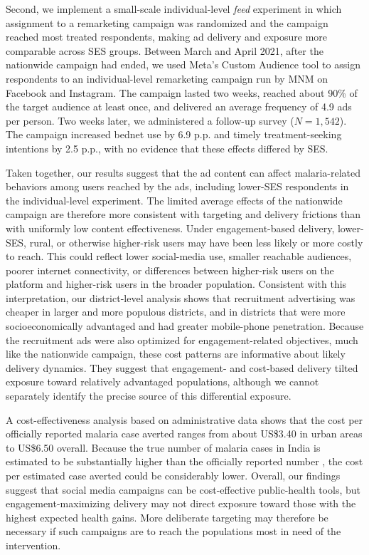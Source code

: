 Second, we implement a small-scale individual-level \textit{feed} experiment in which assignment to a remarketing campaign was randomized and the campaign reached most treated respondents, making ad delivery and exposure more comparable across SES groups. Between March and April 2021, after the nationwide campaign had ended, we used Meta’s Custom Audience tool to assign respondents to an individual-level remarketing campaign run by MNM on Facebook and Instagram. The campaign lasted two weeks, reached about 90\% of the target audience at least once, and delivered an average frequency of 4.9 ads per person. Two weeks later, we administered a follow-up survey ($N=1{,}542$). The campaign increased bednet use by 6.9 p.p. and timely treatment-seeking intentions by 2.5 p.p., with no evidence that these effects differed by SES. %


Taken together, our results suggest that the ad content can affect malaria-related behaviors among users reached by the ads, including lower-SES respondents in the individual-level experiment. The limited average effects of the nationwide campaign are therefore more consistent with targeting and delivery frictions than with uniformly low content effectiveness. Under engagement-based delivery, lower-SES, rural, or otherwise higher-risk users may have been less likely or more costly to reach. This could reflect lower social-media use, smaller reachable audiences, poorer internet connectivity, or differences between higher-risk users on the platform and higher-risk users in the broader population. Consistent with this interpretation, our district-level analysis shows that recruitment advertising was cheaper in larger and more populous districts, and in districts that were more socioeconomically advantaged and had greater mobile-phone penetration. Because the recruitment ads were also optimized for engagement-related objectives, much like the nationwide campaign, these cost patterns are informative about likely delivery dynamics. They suggest that engagement- and cost-based delivery tilted exposure toward relatively advantaged populations, although we cannot separately identify the precise source of this differential exposure.

A cost-effectiveness analysis based on administrative data shows that the cost per officially reported malaria case averted ranges from about US\$3.40 in urban areas to US\$6.50 overall. Because the true number of malaria cases in India is estimated to be substantially higher than the officially reported number \citep{world2021malaria}, the cost per estimated case averted could be considerably lower. Overall, our findings suggest that social media campaigns can be cost-effective public-health tools, but engagement-maximizing delivery may not direct exposure toward those with the highest expected health gains. More deliberate targeting may therefore be necessary if such campaigns are to reach the populations most in need of the intervention.

